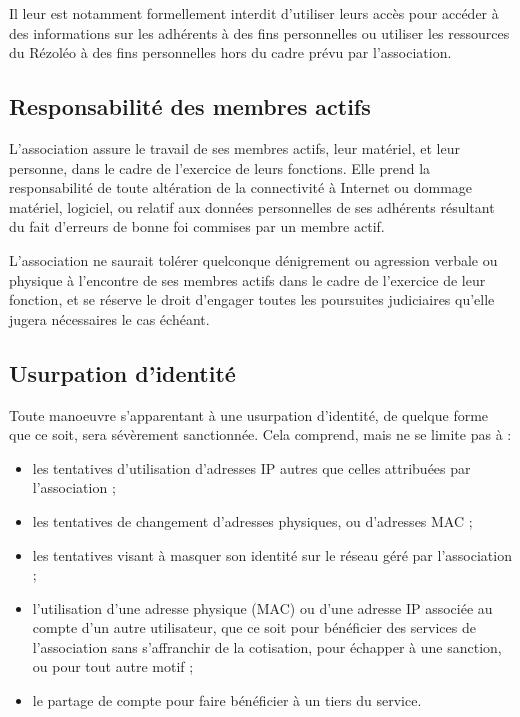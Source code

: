 \documentclass[12pt, a4paper]{article}
\begin{document}
	\bigskip

	Il leur est notamment formellement interdit d'utiliser leurs accès pour
	accéder à des informations sur les adhérents à des fins personnelles ou
	utiliser les ressources du Rézoléo à des fins personnelles hors du cadre prévu
	par l'association.

	\subsection{Responsabilité des membres actifs}

	L'association assure le travail de ses membres actifs, leur matériel, et leur personne,
	dans le cadre de l'exercice de leurs fonctions. Elle prend la responsabilité de
	toute altération de la connectivité à Internet ou dommage matériel, logiciel, ou
	relatif aux données personnelles de ses adhérents résultant du fait d'erreurs de
	bonne foi commises par un membre actif.

	L'association ne saurait tolérer quelconque dénigrement ou agression verbale ou
	physique à l'encontre de ses membres actifs dans le cadre de l'exercice de leur
	fonction, et se réserve le droit d'engager toutes les poursuites judiciaires
	qu'elle jugera nécessaires le cas échéant.

	\subsection{Usurpation d'identité}

	Toute manoeuvre s'apparentant à une usurpation d'identité, de quelque forme
	que ce soit, sera sévèrement sanctionnée. Cela comprend, mais ne se limite pas
	à :

	\bigskip

	\begin{itemize}
		\item[\textbullet] les tentatives d'utilisation d'adresses IP autres que celles
			attribuées par l'association ;

		\item[\textbullet] les tentatives de changement d'adresses physiques, ou d'adresses
			MAC ;

		\item[\textbullet] les tentatives visant à masquer son identité sur le réseau
			géré par l'association ;

		\item[\textbullet] l'utilisation d'une adresse physique (MAC) ou d'une adresse
			IP associée au compte d'un autre utilisateur, que ce soit pour bénéficier
			des services de l'association sans s'affranchir de la cotisation, pour échapper
			à une sanction, ou pour tout autre motif ;

		\item[\textbullet] le partage de compte pour faire bénéficier à un tiers du service.
	\end{itemize}
\end{document}
